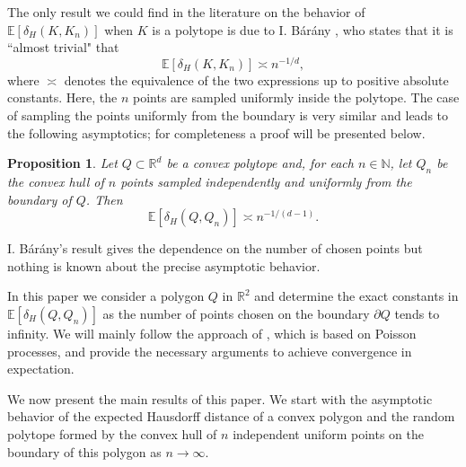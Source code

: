 \documentclass[a4paper,12pt]{article}
\newtheorem{proposition}{Proposition}
\theoremstyle{definition}
\newcommand{\IE}{\mathbb{E}}
\newcommand{\IN}{\mathbb{N}}
\newcommand{\IR}{\mathbb{R}}
\begin{document}
The only result we could find in the literature on the behavior of $\IE [\delta_H(K,K_n)]$ when $K$ is a polytope  is due to I. B\'ar\'any \cite{Bar89}, who states that it is ``almost trivial" that 
$$
 \IE [\delta_H(K,K_n)]\asymp n^{-1/d},
$$
where $\asymp$ denotes the equivalence of the two expressions up to positive absolute constants. Here, the $n$ points are sampled uniformly inside the polytope. The case of sampling the points uniformly from the boundary is very similar and leads to the following asymptotics;  for completeness a proof will be presented below.

\begin{proposition}\label{pro:barany}
Let $Q\subset\IR^d$ be a convex polytope and, for each $n\in\IN$, let $Q_n$ be the convex hull of $n$ points sampled independently and uniformly from the boundary of $Q$. Then
\[
\IE [\delta_H(Q,Q_n)]\asymp n^{-1/(d-1)}.
\]
\end{proposition}

I. B\'ar\'any's result gives the dependence on the number of chosen points but nothing is known about the precise asymptotic behavior. 

In this paper we consider a polygon $Q$ in $\mathbb{R}^2$ and determine the exact constants in $\IE[ \delta_H(Q,Q_n)]$ as the number of points chosen on the boundary $\partial Q$ tends to infinity. We will mainly follow the approach of \cite{BHB98}, which is based on Poisson processes, and provide the necessary arguments to achieve convergence in expectation. 

We now present the main results of this paper. We start with the asymptotic behavior of the expected Hausdorff distance of a convex polygon and the random polytope formed by the convex hull of $n$ independent uniform points on the boundary of this polygon as $n\to\infty$.
\end{document}
